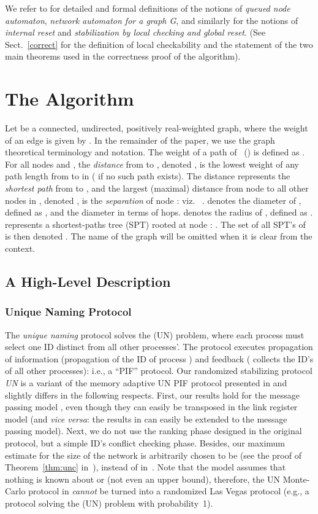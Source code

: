 \documentclass[10pt]{article}
\begin{document}
We refer to \cite{APVD94} for detailed and formal definitions of the
notions of {\em queued node automaton}, {\em network automaton for a
graph G}, and similarly for the notions of {\em internal reset} and
{\em stabilization by local checking and global reset}. (See
Sect.~\ref{correct} for the definition of local checkability and the
statement of the two main theorems used in the correctness proof of the
algorithm).

\section{The Algorithm}\label{algo}
Let  be a connected, undirected, positively
real-weighted graph, where the weight of an edge  is
given by . In the remainder of the paper, we use the
graph theoretical terminology and notation. The weight of a path
 of~ () is defined as
. For all nodes  and ,
the {\em distance} from  to , denoted , is the lowest
weight of any path length from  to  in  ( if no such
path exists).  The distance  represents the {\em shortest
path} from  to , and the largest (maximal) distance from node
 to all other nodes in , denoted , is the {\em
separation} of node : viz. ~\cite{Chri75}.   denotes the diameter of , defined as
, and  the diameter in
terms of hops.  denotes the radius of , defined as
.  represents a shortest-paths
tree (SPT) rooted at node : .  The set of all SPT's of  is then
denoted . The name of the graph will be omitted when it is clear from the context.

\subsection{A High-Level Description}

\subsubsection{Unique Naming Protocol} \label{un}
The {\em unique naming} protocol solves the (UN) problem, where each
process  must select one ID distinct from all other processes'.
The protocol executes propagation of information (propagation of the
ID of process ) and feedback ( collects the ID's of all other
processes): i.e., a ``PIF'' protocol.  Our randomized stabilizing
protocol {\em UN} is a variant of the memory adaptive UN PIF protocol
presented in \cite{AnEH92} and slightly differs in the following
respects.  First, our results hold for the message passing model , even though they can easily be transposed in the link register
model (and {\em vice versa}: the results in \cite{AnEH92} can easily
be extended to the message passing model).  Next, we do not use the
ranking phase designed in the original protocol, but a simple ID's
conflict checking phase. Besides, our maximum estimate for the size of
the network is arbitrarily chosen to be  (see the proof of
Theorem~\ref{thm:unc} in~\cite{BuBL95}), instead of  in~\cite{AnEH92}.  Note that the model  assumes that
nothing is known about  or  (not even an upper bound),
therefore, the UN Monte-Carlo protocol in
\cite{AnEH92} {\em cannot} be turned into a randomized Las Vegas
protocol (e.g., a protocol solving the (UN) problem with probability~1).
\end{document}
